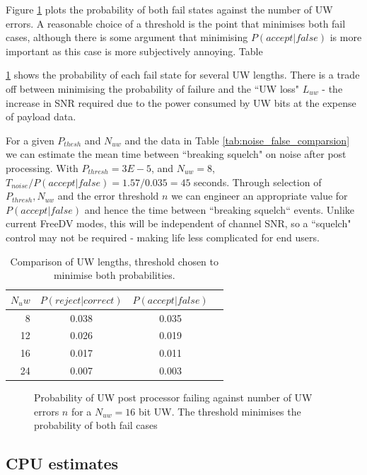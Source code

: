 \documentclass{article}
\begin{document}
Figure \ref{fig:acq_uw} plots the probability of both fail states against the number of UW errors.  A reasonable choice of a threshold is the point that minimises both fail cases, although there is some argument that minimising $P(accept|false)$ is more important as this case is more subjectively annoying.  Table {\ref{tab:acq_uw} shows the probability of each fail state for several UW lengths.  There is a trade off between minimising the probability of failure and the ``UW loss" $L_{uw}$ - the increase in SNR required due to the power consumed by UW bits at the expense of payload data. 

For a given $P_{thesh}$ and $N_{uw}$ and the data in Table \ref{tab:noise_false_comparsion} we can estimate the mean time between ``breaking squelch" on noise after post processing. With $P_{thresh}=3E-5$, and $N_{uw}=8$, $T_{noise}/P(accept|false)=1.57/0.035=45$ seconds.  Through selection of $P_{thresh}, N_{uw}$ and the error threshold $n$ we can engineer an appropriate value for $P(accept|false)$ and hence the time between ``breaking squelch`` events.  Unlike current FreeDV modes, this will be independent of channel SNR, so a ``squelch" control may not be required - making life less complicated for end users.

\begin{table}[h]
\centering
\begin{tabular}{r c c c}
 \hline
 $N_uw$ & $P(reject|correct)$ & $P(accept|false)$ \\ 
 \hline
 8  & 0.038 & 0.035 \\
 12 & 0.026 & 0.019 \\
 16 & 0.017 & 0.011 \\
 24 & 0.007 & 0.003 \\
 \hline
\end{tabular}
\caption{Comparison of UW lengths, threshold chosen to minimise both probabilities.}
\label{tab:acq_uw}
\end{table}

\begin{figure}[H]
\caption{Probability of UW post processor failing against number of UW errors $n$ for a $N_{uw}=16$ bit UW.  The threshold minimises the probability of both fail cases}
\label{fig:acq_uw}
\begin{center}

\end{center}
\end{figure}

\subsection{CPU estimates}

}
\end{document}
